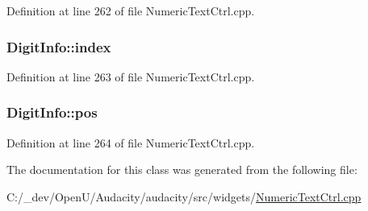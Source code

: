 Definition at line 262 of file Numeric\+Text\+Ctrl.\+cpp.

\subsubsection[{\texorpdfstring{index}{index}}]{ Digit\+Info\+::index}\hypertarget{class_digit_info_a6228de8cea52d810eac73f05a543a0d9}{}\label{class_digit_info_a6228de8cea52d810eac73f05a543a0d9}


Definition at line 263 of file Numeric\+Text\+Ctrl.\+cpp.

\subsubsection[{\texorpdfstring{pos}{pos}}]{ Digit\+Info\+::pos}\hypertarget{class_digit_info_aa03c72354b249402c1d8740aa5efaf96}{}\label{class_digit_info_aa03c72354b249402c1d8740aa5efaf96}


Definition at line 264 of file Numeric\+Text\+Ctrl.\+cpp.



The documentation for this class was generated from the following file\+:\begin{DoxyCompactItemize}
\item 
C\+:/\+\_\+dev/\+Open\+U/\+Audacity/audacity/src/widgets/\hyperlink{_numeric_text_ctrl_8cpp}{Numeric\+Text\+Ctrl.\+cpp}\end{DoxyCompactItemize}
